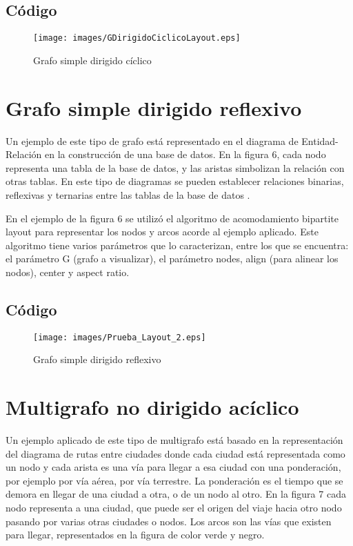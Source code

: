 \documentclass{article}
\begin{document}
\subsection{Código}



\begin{figure}[H]
\centering
\texttt{[image: images/GDirigidoCiclicoLayout.eps]}
\caption{Grafo simple dirigido  cíclico}
\end{figure}

\section{Grafo simple dirigido reflexivo}

Un ejemplo de este tipo de grafo está representado en el diagrama de Entidad-Relación en la construcción de una base de datos. En la figura 6, cada nodo representa una tabla de la base de datos, y las aristas simbolizan la relación con otras tablas. En este tipo de diagramas se pueden establecer relaciones binarias, reflexivas y ternarias entre las tablas de la base de datos \cite{departamento}. 

En el ejemplo de la figura 6 se utilizó el algoritmo de acomodamiento bipartite layout para representar los nodos y arcos acorde al ejemplo aplicado. Este algoritmo tiene varios parámetros que lo caracterizan, entre los que se encuentra: el parámetro G (grafo a visualizar), el parámetro nodes, align (para alinear los nodos), center y aspect ratio.

\subsection{Código}


\begin{figure}[H]
\centering
\texttt{[image: images/Prueba\_Layout\_2.eps]}
\caption{Grafo simple dirigido reflexivo}
\end{figure}

\section{Multigrafo no dirigido acíclico}

Un ejemplo aplicado de este tipo de multigrafo está basado en la representación del diagrama de rutas entre ciudades donde cada ciudad está representada como un nodo y cada arista es una vía para  llegar a esa ciudad con una ponderación, por ejemplo por vía aérea, por vía terrestre. La ponderación es el tiempo que se demora en llegar de una ciudad a otra, o de un nodo al otro. En la figura 7 cada nodo representa a una ciudad, que puede ser el origen del viaje hacia otro nodo pasando por varias otras ciudades o nodos. Los arcos son las vías que existen para llegar, representados en la figura de color verde y negro. 
\end{document}
